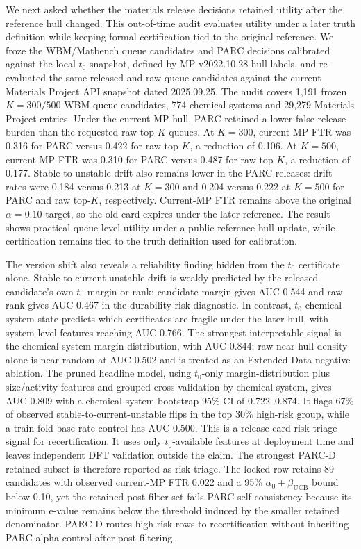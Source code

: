 \documentclass[10pt,twocolumn]{article}
\begin{document}
We next asked whether the materials release decisions retained utility after the reference hull changed.
This out-of-time audit evaluates utility under a later truth definition while keeping formal certification tied to the original reference.
We froze the WBM/Matbench queue candidates and PARC decisions calibrated against the local \(t_0\) snapshot, defined by MP v2022.10.28 hull labels, and re-evaluated the same released and raw queue candidates against the current Materials Project API snapshot dated 2025.09.25.
The audit covers 1,191 frozen \(K=300/500\) WBM queue candidates, 774 chemical systems and 29,279 Materials Project entries.
Under the current-MP hull, PARC retained a lower false-release burden than the requested raw top-\(K\) queues.
At \(K=300\), current-MP FTR was 0.316 for PARC versus 0.422 for raw top-\(K\), a reduction of 0.106.
At \(K=500\), current-MP FTR was 0.310 for PARC versus 0.487 for raw top-\(K\), a reduction of 0.177.
Stable-to-unstable drift also remains lower in the PARC releases: drift rates were 0.184 versus 0.213 at \(K=300\) and 0.204 versus 0.222 at \(K=500\) for PARC and raw top-\(K\), respectively.
Current-MP FTR remains above the original \(\alpha=0.10\) target, so the old card expires under the later reference.
The result shows practical queue-level utility under a public reference-hull update, while certification remains tied to the truth definition used for calibration.

The version shift also reveals a reliability finding hidden from the \(t_0\) certificate alone.
Stable-to-current-unstable drift is weakly predicted by the released candidate's own \(t_0\) margin or rank: candidate margin gives AUC 0.544 and raw rank gives AUC 0.467 in the durability-risk diagnostic.
In contrast, \(t_0\) chemical-system state predicts which certificates are fragile under the later hull, with system-level features reaching AUC 0.766.
The strongest interpretable signal is the chemical-system margin distribution, with AUC 0.844; raw near-hull density alone is near random at AUC 0.502 and is treated as an Extended Data negative ablation.
The pruned headline model, using \(t_0\)-only margin-distribution plus size/activity features and grouped cross-validation by chemical system, gives AUC 0.809 with a chemical-system bootstrap 95\% CI of 0.722--0.874.
It flags 67\% of observed stable-to-current-unstable flips in the top 30\% high-risk group, while a train-fold base-rate control has AUC 0.500.
This is a release-card risk-triage signal for recertification.
It uses only \(t_0\)-available features at deployment time and leaves independent DFT validation outside the claim.
The strongest PARC-D retained subset is therefore reported as risk triage.
The locked row retains 89 candidates with observed current-MP FTR 0.022 and a 95\% \(\alpha_0+\beta_{\mathrm{UCB}}\) bound below 0.10, yet the retained post-filter set fails PARC self-consistency because its minimum e-value remains below the threshold induced by the smaller retained denominator.
PARC-D routes high-risk rows to recertification without inheriting PARC alpha-control after post-filtering.
\end{document}
